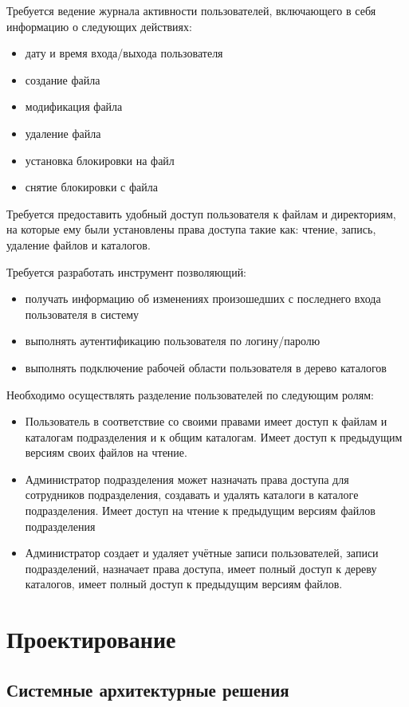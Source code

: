 \documentclass[utf8,usehyperref,12pt]{G7-32}
\begin{document}
Требуется ведение журнала активности пользователей, включающего в себя информацию о следующих действиях: 
\begin{itemize}
\item дату и время входа/выхода пользователя
\item создание файла
\item модификация файла
\item удаление файла
\item установка блокировки на файл
\item снятие блокировки с файла
\end{itemize}

Требуется предоставить удобный доступ пользователя к файлам и директориям, на которые ему были установлены права доступа такие как: чтение, запись, удаление файлов и каталогов.

Требуется разработать инструмент позволяющий:	
\begin{itemize}
\item получать информацию об изменениях произошедших с последнего входа пользователя в систему	
\item выполнять аутентификацию пользователя по логину/паролю	
\item выполнять подключение рабочей области пользователя в дерево каталогов
\end{itemize}

Необходимо осуществлять разделение пользователей по следующим ролям:	
\begin{itemize}
\item Пользователь 	в соответствие со своими правами имеет 	доступ к файлам и каталогам подразделения и к общим каталогам. Имеет доступ к предыдущим версиям своих файлов на чтение. 		
\item Администратор подразделения может назначать права 	доступа для сотрудников подразделения, создавать и удалять каталоги в каталоге подразделения. Имеет доступ на чтение к предыдущим версиям файлов подразделения	
\item Администратор создает и удаляет учётные записи пользователей, записи подразделений, назначает права доступа, имеет полный 	доступ к дереву каталогов, имеет полный 	доступ к предыдущим версиям файлов.
\end{itemize}

\chapter{Проектирование}
\section{Системные архитектурные решения}
\end{document}
